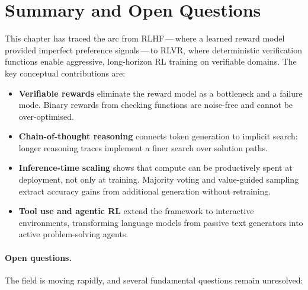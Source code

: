 \section{Summary and Open Questions}
\label{sec:reasoning-summary}

This chapter has traced the arc from RLHF\,---\,where a learned
reward model provided imperfect preference signals\,---\,to RLVR,
where deterministic verification functions enable aggressive,
long-horizon RL training on verifiable domains. The key conceptual
contributions are:

\begin{itemize}[leftmargin=*]
\item \textbf{Verifiable rewards} eliminate the reward model as a
  bottleneck and a failure mode. Binary rewards from checking functions
  are noise-free and cannot be over-optimised.

\item \textbf{Chain-of-thought reasoning} connects token generation
  to implicit search: longer reasoning traces implement a finer
  search over solution paths.

\item \textbf{Inference-time scaling} shows that compute can be
  productively spent at deployment, not only at training. Majority
  voting and value-guided sampling extract accuracy gains from
  additional generation without retraining.

\item \textbf{Tool use and agentic RL} extend the framework to
  interactive environments, transforming language models from passive
  text generators into active problem-solving agents.
\end{itemize}

\paragraph{Open questions.} The field is moving rapidly, and several
fundamental questions remain unresolved:

